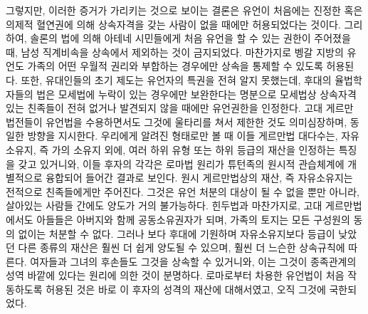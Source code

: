 그렇지만,
이러한 증거가 가리키는 것으로 보이는 결론은
유언이 처음에는
진정한 혹은 의제적 혈연권에 의해
상속자격을 갖는 사람이 없을 때에만 허용되었다는 것이다.
그리하여,
솔론의 법에 의해
아테네 시민들에게 처음
유언을 할 수 있는 권한이 주어졌을 때,
남성 직계비속을 상속에서 제외하는 것이 금지되었다.
마찬가지로 벵갈 지방의 유언도
가족의 어떤 우월적 권리와 부합하는 경우에만
상속을 통제할 수 있도록 허용된다.
또한, 유대인들의 초기 제도는 유언자의 특권을 전혀 알지 못했는데,
후대의 율법학자들의 법은
모세법에 누락이 있는 경우에만 보완한다는 명분으로
모세법상 상속자격 있는 친족들이 전혀 없거나 발견되지 않을 때에만
유언권한을 인정한다.
고대 게르만 법전들이 유언법을 수용하면서도 그것에 울타리를 쳐서 제한한 것도
의미심장하며, 동일한 방향을 지시한다.
우리에게 알려진 형태로만 볼 때 이들 게르만법 대다수는,
자유소유지, 즉 가의 소유지 외에,
여러 하위 유형 또는 하위 등급의 재산을 인정하는
특징을 갖고 있거니와,
이들 후자의 각각은 로마법 원리가 튜턴족의 원시적 관습체계에
개별적으로 융합되어 들어간 결과로 보인다.
원시 게르만법상의 재산, 즉 자유소유지는 전적으로 친족들에게만 주어진다.
그것은 유언 처분의 대상이 될 수 없을 뿐만 아니라,
살아있는 사람들 간에도 양도가 거의 불가능하다.
힌두법과 마찬가지로, 고대 게르만법에서도
아들들은 아버지와 함께 공동소유권자가 되며,
가족의 토지는 모든 구성원의 동의 없이는 처분할 수 없다.
그러나 보다 후대에 기원하며 자유소유지보다 등급이 낮았던
다른 종류의 재산은 훨씬 더 쉽게 양도될 수 있으며,
훨씬 더 느슨한 상속규칙에 따른다.
여자들과 그녀의 후손들도 그것을 상속할 수 있거니와, 이는
그것이 종족관계의 성역 바깥에 있다는
원리에 의한 것이 분명하다.
로마로부터 차용한 유언법이 처음 작동하도록 허용된 것은
바로 이 후자의 성격의 재산에 대해서였고, 오직 그것에 국한되었다.


